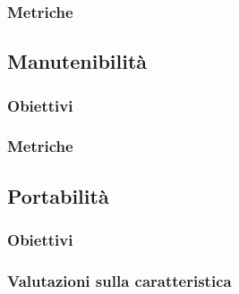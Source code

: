 \subsubsection{Metriche}


\subsection{Manutenibilità}

\subsubsection{Obiettivi}

\subsubsection{Metriche}


\subsection{Portabilità}

\subsubsection{Obiettivi}

\subsubsection{Valutazioni sulla caratteristica}
